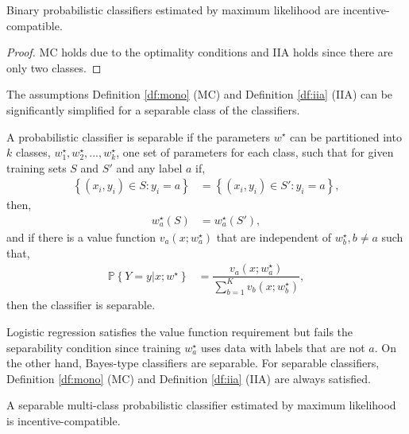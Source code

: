 \documentclass{article}
\begin{document}
\begin{cor} \label{cor:binpr} 
Binary probabilistic classifiers estimated by maximum likelihood are incentive-compatible.
\end{cor}
\begin{proof} \label{proof:binpr} 
MC holds due to the optimality conditions and IIA holds since there are only two classes.
\newline \newline\end{proof}
The assumptions Definition \ref{df:mono} (MC) and Definition \ref{df:iia} (IIA) can be significantly simplified for a separable class of the classifiers.
\newline \newline
\begin{df} \label{df:sep} 
A probabilistic classifier is separable if the parameters $w^\star $ can be partitioned into $k $ classes, $w^\star _{1}, w^\star _{2}, ..., w^\star _{k}$, one set of parameters for each class, such that for given training sets $S $ and $S'$ and any label $a $ if,
\begin{align*}
\left\{\left(x_{i}, y_{i}\right) \in S : y_{i} = a\right\} &= \left\{\left(x_{i}, y_{i}\right) \in S' : y_{i} = a\right\},
\end{align*}
then,
\begin{align*}
w^\star _{a}\left(S\right) &= w^\star _{a}\left(S'\right),
\end{align*}
and if there is a value function $v_{a}\left(x; w^\star _{a}\right)$ that are independent of $w^\star _{b}, b \neq  a $ such that,
\begin{align*}
\mathbb{P}\left\{Y = y | x; w^\star \right\} &= \dfrac{v_{a}\left(x; w^\star _{a}\right)}{\displaystyle\sum_{b=1}^{K} v_{b}\left(x; w^\star _{b}\right)},
\end{align*}
then the classifier is separable.
\newline \newline\end{df}
Logistic regression satisfies the value function requirement but fails the separability condition since training $w^\star _{a}$ uses data with labels that are not $a $. On the other hand, Bayes-type classifiers are separable. For separable classifiers, Definition \ref{df:mono} (MC) and Definition \ref{df:iia} (IIA) are always satisfied.
\newline \newline
\begin{cor} \label{cor:sepmargin} 
A separable multi-class probabilistic classifier estimated by maximum likelihood is incentive-compatible.
\end{cor}
\end{document}
